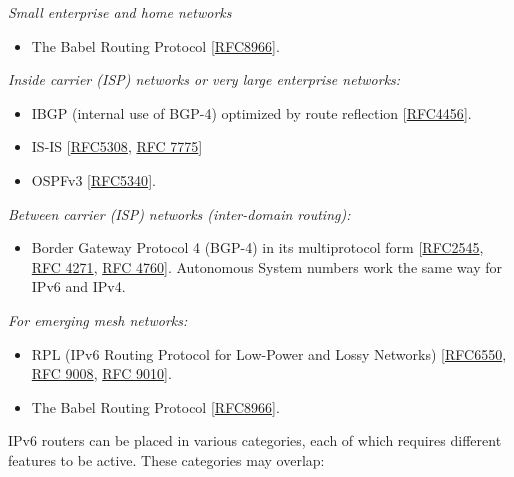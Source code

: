 \documentclass[
]{article}
\providecommand{\tightlist}{%
  \setlength{\itemsep}{0pt}\setlength{\parskip}{0pt}}
\begin{document}
\emph{Small enterprise and home networks}

\begin{itemize}
\tightlist
\item
  The Babel Routing Protocol
  {[}\href{https://www.rfc-editor.org/info/rfc8966}{RFC8966}{]}.
\end{itemize}

\emph{Inside carrier (ISP) networks or very large enterprise networks:}

\begin{itemize}
\item
  IBGP (internal use of BGP-4) optimized by route reflection
  {[}\href{https://www.rfc-editor.org/info/rfc4456}{RFC4456}{]}.
\item
  IS-IS {[}\href{https://www.rfc-editor.org/info/rfc5308}{RFC5308},
  \href{https://www.rfc-editor.org/info/rfc7775}{RFC 7775}{]}
\item
  OSPFv3 {[}\href{https://www.rfc-editor.org/info/rfc5340}{RFC5340}{]}.
\end{itemize}

\emph{Between carrier (ISP) networks (inter-domain routing):}

\begin{itemize}
\tightlist
\item
  Border Gateway Protocol 4 (BGP-4) in its multiprotocol form
  {[}\href{https://www.rfc-editor.org/info/rfc2545}{RFC2545},
  \href{https://www.rfc-editor.org/info/rfc4271}{RFC 4271},
  \href{https://www.rfc-editor.org/info/rfc4760}{RFC 4760}{]}.
  Autonomous System numbers work the same way for IPv6 and IPv4.
\end{itemize}

\emph{For emerging mesh networks:}

\begin{itemize}
\item
  RPL (IPv6 Routing Protocol for Low-Power and Lossy Networks)
  {[}\href{https://www.rfc-editor.org/info/rfc6550}{RFC6550},
  \href{https://www.rfc-editor.org/info/rfc9008}{RFC 9008},
  \href{https://www.rfc-editor.org/info/rfc9010}{RFC 9010}{]}.
\item
  The Babel Routing Protocol
  {[}\href{https://www.rfc-editor.org/info/rfc8966}{RFC8966}{]}.
\end{itemize}

IPv6 routers can be placed in various categories, each of which requires
different features to be active. These categories may overlap:
\end{document}

